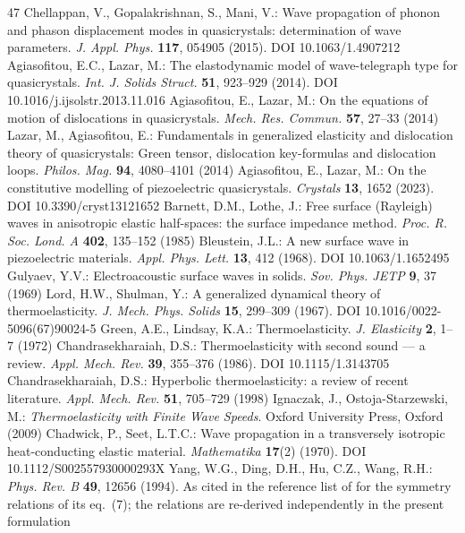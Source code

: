 \documentclass[11pt]{article}
\begin{document}
\begin{thebibliography}{47}
 Chellappan, V., Gopalakrishnan, S., Mani, V.: Wave propagation of phonon and phason displacement modes in quasicrystals: determination of wave parameters. \emph{J. Appl. Phys.} \textbf{117}, 054905 (2015). DOI 10.1063/1.4907212
 Agiasofitou, E.C., Lazar, M.: The elastodynamic model of wave-telegraph type for quasicrystals. \emph{Int. J. Solids Struct.} \textbf{51}, 923--929 (2014). DOI 10.1016/j.ijsolstr.2013.11.016
 Agiasofitou, E., Lazar, M.: On the equations of motion of dislocations in quasicrystals. \emph{Mech. Res. Commun.} \textbf{57}, 27--33 (2014)
 Lazar, M., Agiasofitou, E.: Fundamentals in generalized elasticity and dislocation theory of quasicrystals: Green tensor, dislocation key-formulas and dislocation loops. \emph{Philos. Mag.} \textbf{94}, 4080--4101 (2014)
 Agiasofitou, E., Lazar, M.: On the constitutive modelling of piezoelectric quasicrystals. \emph{Crystals} \textbf{13}, 1652 (2023). DOI 10.3390/cryst13121652
 Barnett, D.M., Lothe, J.: Free surface (Rayleigh) waves in anisotropic elastic half-spaces: the surface impedance method. \emph{Proc. R. Soc. Lond. A} \textbf{402}, 135--152 (1985)
 Bleustein, J.L.: A new surface wave in piezoelectric materials. \emph{Appl. Phys. Lett.} \textbf{13}, 412 (1968). DOI 10.1063/1.1652495
 Gulyaev, Y.V.: Electroacoustic surface waves in solids. \emph{Sov. Phys. JETP} \textbf{9}, 37 (1969)
 Lord, H.W., Shulman, Y.: A generalized dynamical theory of thermoelasticity. \emph{J. Mech. Phys. Solids} \textbf{15}, 299--309 (1967). DOI 10.1016/0022-5096(67)90024-5
 Green, A.E., Lindsay, K.A.: Thermoelasticity. \emph{J. Elasticity} \textbf{2}, 1--7 (1972)
 Chandrasekharaiah, D.S.: Thermoelasticity with second sound --- a review. \emph{Appl. Mech. Rev.} \textbf{39}, 355--376 (1986). DOI 10.1115/1.3143705
 Chandrasekharaiah, D.S.: Hyperbolic thermoelasticity: a review of recent literature. \emph{Appl. Mech. Rev.} \textbf{51}, 705--729 (1998)
 Ignaczak, J., Ostoja-Starzewski, M.: \emph{Thermoelasticity with Finite Wave Speeds}. Oxford University Press, Oxford (2009)
 Chadwick, P., Seet, L.T.C.: Wave propagation in a transversely isotropic heat-conducting elastic material. \emph{Mathematika} \textbf{17}(2) (1970). DOI 10.1112/S002557930000293X
 Yang, W.G., Ding, D.H., Hu, C.Z., Wang, R.H.: \emph{Phys. Rev. B} \textbf{49}, 12656 (1994). As cited in the reference list of \cite{wang2021} for the symmetry relations of its eq.~(7); the relations are re-derived independently in the present formulation

\end{thebibliography}
\end{document}
